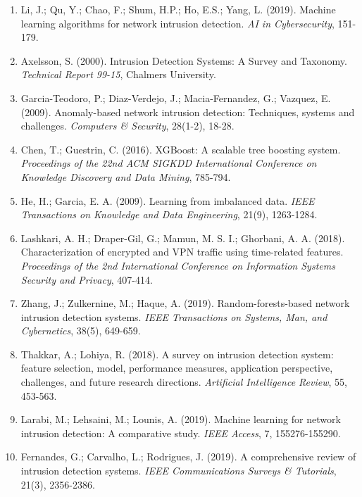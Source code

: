 \documentclass[12pt,a4paper]{report}
\begin{document}
\begin{enumerate}
\item Li, J.; Qu, Y.; Chao, F.; Shum, H.P.; Ho, E.S.; Yang, L. (2019). Machine learning algorithms for network intrusion detection. \textit{AI in Cybersecurity}, 151-179.

\item Axelsson, S. (2000). Intrusion Detection Systems: A Survey and Taxonomy. \textit{Technical Report 99-15}, Chalmers University.

\item Garcia-Teodoro, P.; Diaz-Verdejo, J.; Macia-Fernandez, G.; Vazquez, E. (2009). Anomaly-based network intrusion detection: Techniques, systems and challenges. \textit{Computers \& Security}, 28(1-2), 18-28.

\item Chen, T.; Guestrin, C. (2016). XGBoost: A scalable tree boosting system. \textit{Proceedings of the 22nd ACM SIGKDD International Conference on Knowledge Discovery and Data Mining}, 785-794.

\item He, H.; Garcia, E. A. (2009). Learning from imbalanced data. \textit{IEEE Transactions on Knowledge and Data Engineering}, 21(9), 1263-1284.

\item Lashkari, A. H.; Draper-Gil, G.; Mamun, M. S. I.; Ghorbani, A. A. (2018). Characterization of encrypted and VPN traffic using time-related features. \textit{Proceedings of the 2nd International Conference on Information Systems Security and Privacy}, 407-414.

\item Zhang, J.; Zulkernine, M.; Haque, A. (2019). Random-forests-based network intrusion detection systems. \textit{IEEE Transactions on Systems, Man, and Cybernetics}, 38(5), 649-659.

\item Thakkar, A.; Lohiya, R. (2018). A survey on intrusion detection system: feature selection, model, performance measures, application perspective, challenges, and future research directions. \textit{Artificial Intelligence Review}, 55, 453-563.

\item Larabi, M.; Lehsaini, M.; Lounis, A. (2019). Machine learning for network intrusion detection: A comparative study. \textit{IEEE Access}, 7, 155276-155290.

\item Fernandes, G.; Carvalho, L.; Rodrigues, J. (2019). A comprehensive review of intrusion detection systems. \textit{IEEE Communications Surveys \& Tutorials}, 21(3), 2356-2386.

\end{enumerate}
\end{document}

